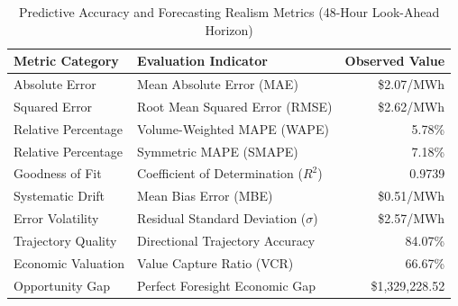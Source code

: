 \begin{table}[htbp]
\centering
\small
\caption{Predictive Accuracy and Forecasting Realism Metrics (48-Hour Look-Ahead Horizon)}
\label{tab:forecast_realism}
\begin{tabular}{llr}
\toprule
\textbf{Metric Category} & \textbf{Evaluation Indicator} & \textbf{Observed Value} \\
\midrule
Absolute Error & Mean Absolute Error (MAE) & \$2.07/MWh \\
Squared Error & Root Mean Squared Error (RMSE) & \$2.62/MWh \\
Relative Percentage & Volume-Weighted MAPE (WAPE) & 5.78\% \\
Relative Percentage & Symmetric MAPE (SMAPE) & 7.18\% \\
Goodness of Fit & Coefficient of Determination ($R^2$) & 0.9739 \\
Systematic Drift & Mean Bias Error (MBE) & \$0.51/MWh \\
Error Volatility & Residual Standard Deviation ($\sigma$) & \$2.57/MWh \\
Trajectory Quality & Directional Trajectory Accuracy & 84.07\% \\
Economic Valuation & Value Capture Ratio (VCR) & 66.67\% \\
Opportunity Gap & Perfect Foresight Economic Gap & \$1,329,228.52 \\
\bottomrule
\end{tabular}
\end{table}
